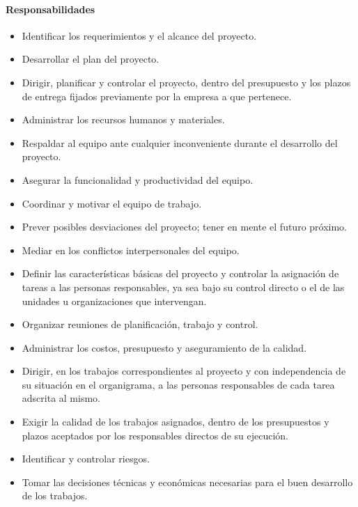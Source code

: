 \paragraph{Responsabilidades}
            \begin{itemize}
                \item Identificar los requerimientos y el alcance del proyecto.
                \item Desarrollar el plan del proyecto.
                \item Dirigir, planificar y controlar el proyecto, dentro del presupuesto y los plazos de entrega fijados previamente por la empresa a que pertenece.
				\item Administrar los recursos humanos y materiales.
                \item Respaldar al equipo ante cualquier inconveniente durante el desarrollo del proyecto.
                \item Asegurar la funcionalidad y productividad del equipo.
                \item Coordinar y motivar el equipo de trabajo.
                \item Prever posibles desviaciones del proyecto; tener en mente el futuro próximo.
                \item Mediar en los conflictos interpersonales del equipo.
                \item Definir las características básicas del proyecto y controlar la asignación de tareas a las personas responsables, ya sea bajo su control directo o el de las unidades u organizaciones que intervengan.
                \item Organizar reuniones de planificación, trabajo y control.
                \item Administrar los costos, presupuesto y aseguramiento de la calidad.
                \item Dirigir, en los trabajos correspondientes al proyecto y con independencia de su situación en el organigrama, a las personas responsables de cada tarea adscrita al mismo.
                \item Exigir la calidad de los trabajos asignados, dentro de los presupuestos y plazos aceptados por los responsables directos de su ejecución.
                \item Identificar y controlar riesgos.
                \item Tomar las decisiones técnicas y económicas necesarias para el buen desarrollo de los trabajos.
			\end{itemize}
             
